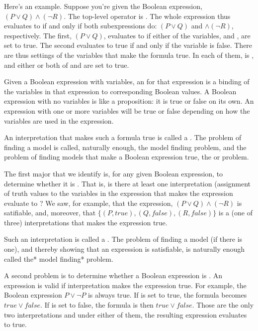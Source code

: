 \documentclass[letterpaper,10pt,english]{sphinxmanual}
\begin{document}
Here’s an example. Suppose you’re given the Boolean expression,
\((P \lor Q) \land (\lnot R)\). The top-level operator is
. The whole expression thus evaluates to  if and only if
both subexpressions do: \((P \lor Q)\) and \(\land (\lnot
R)\), respectively. The first, \((P \lor Q)\), evaluates to 
if either of the variables,  and , are set to true. The second
evaluates to true if and only if the variable  is false. There are
thus settings of the variables that make the formula true. In each of
them,  is , and either or both of  and  are set to
true.

Given a Boolean expression with variables, an  for
that expression is a binding of the variables in that expression to
corresponding Boolean values. A Boolean expression with no variables
is like a proposition: it is true or false on its own. An expression
with one or more variables will be true or false depending on how the
variables are used in the expression.

An interpretation that makes such a formula true is called a .
The problem of finding a model is called, naturally enough, the model
finding problem, and the problem of finding  models that make a
Boolean expression true, the  or 
problem.

The first major  that we identify is, for any given
Boolean expression, to determine whether it is . That is,
is there at least one interpretation (assignment of truth values to
the variables in the expression that makes the expression evaluate to
?  We saw, for example, that the expression, \((P \lor Q)
\land (\lnot R)\) is satifiable, and, moreover, that \(\{ (P,
true), (Q, false), (R, false) \}\) is a (one of three) interpretations
that makes the expression true.

Such an interpretation is called a . The problem of finding a
model (if there is one), and thereby showing that an expression is
satisfiable, is naturally enough called the* model finding* problem.

A second problem is to determine whether a Boolean expression is
. An expression is valid if  interpretation makes the
expression true. For example, the Boolean expression \(P \lor
\neg P\) is always true. If  is set to true, the formula becomes
\(true \lor false\). If  is set to false, the formula is then
\(true \lor false\). Those are the only two interpretations and
under either of them, the resulting expression evaluates to true.
\end{document}
